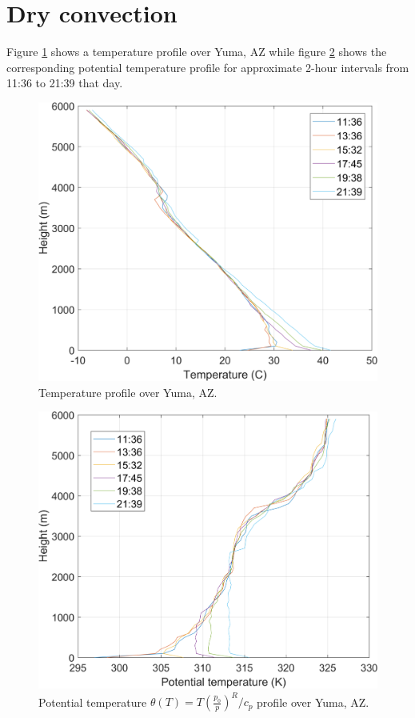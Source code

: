 \documentclass[11pt]{article}
\begin{document}
\section{Dry convection}

Figure \ref{fig:YumaT} shows a temperature profile over Yuma, AZ while figure \ref{fig:YumaPotentialT} shows the corresponding potential temperature profile for approximate 2-hour intervals from 11:36 to 21:39 that day.

\begin{figure}
	\centering
	\includegraphics[width=\textwidth]{YumaTemp.png}
	\caption{Temperature profile over Yuma, AZ.}
	\label{fig:YumaT}
\end{figure}

\begin{figure}
	\centering
	\includegraphics[width=\textwidth]{YumaPotentialTemp.png}
	\caption{Potential temperature $\displaystyle \theta(T) = T\left(\frac{p_0}{p}\right)^R/c_p$ profile over Yuma, AZ.}
	\label{fig:YumaPotentialT}
\end{figure}
\end{document}
